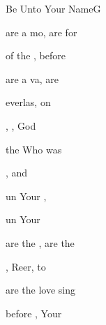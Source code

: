 \begin{song}{Be Unto Your Name}{G}
    {}
    {}
    {}
    {\CCLIed}

\begin{SBVerse}
 are a mo,  are for 

 of the ,  before 

 are a va,  are 

 everlas,  on  
\end{SBVerse}

\begin{SBChorus}
, ,  God  

  the  Who was  

 ,  and  

 un Your , 

 un Your 
\end{SBChorus}

\begin{SBVerse}
 are the ,  are the  

, Reer,  to  

 are the love   sing  

 before ,  Your  
\end{SBVerse}
\end{song}


